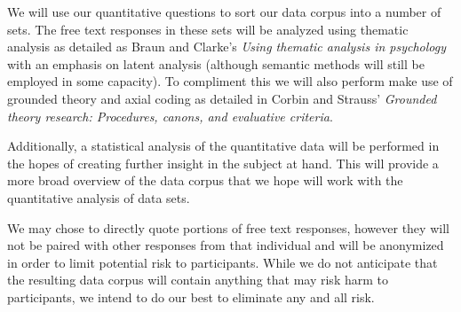 \documentclass[]{article}
\begin{document}
    We will use our quantitative questions to sort our data corpus into a number of sets. The free text responses in these sets will be analyzed using thematic analysis as detailed as Braun and Clarke's \emph{Using thematic analysis in psychology}\cite{doi:10.1191/1478088706qp063oa} with an emphasis on latent analysis (although semantic methods will still be employed in some capacity). To compliment this we will also perform make use of grounded theory and axial coding as detailed in Corbin and Strauss' \emph{Grounded theory research: Procedures, canons, and evaluative criteria}\cite{Corbin1990}.

    Additionally, a statistical analysis of the quantitative data will be performed in the hopes of creating further insight in the subject at hand. This will provide a more broad overview of the data corpus that we hope will work with the quantitative analysis of data sets.

    We may chose to directly quote portions of free text responses, however they will not be paired with other responses from that individual and will be anonymized in order to limit potential risk to participants. While we do not anticipate that the resulting data corpus will contain anything that may risk harm to participants, we intend to do our best to eliminate any and all risk.

    \medskip

    
    
		
\end{document}
